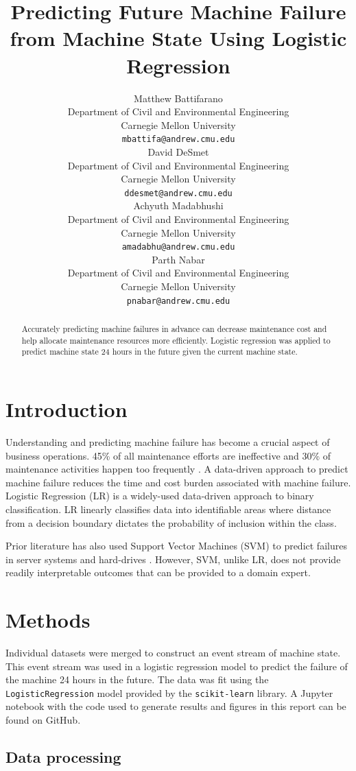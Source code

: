 \documentclass{article}
\title{Predicting Future Machine Failure from Machine State Using Logistic Regression}
\author{
  Matthew Battifarano\\
  Department of Civil and Environmental Engineering\\
  Carnegie Mellon University\\
  \texttt{mbattifa@andrew.cmu.edu} \\
   \And
  David DeSmet \\
  Department of Civil and Environmental Engineering \\
  Carnegie Mellon University \\
  \texttt{ddesmet@andrew.cmu.edu} \\
  \And
  Achyuth Madabhushi\\
  Department of Civil and Environmental Engineering\\
  Carnegie Mellon University  \\
  \texttt{amadabhu@andrew.cmu.edu} \\
  \AND
  Parth Nabar \\
  Department of Civil and Environmental Engineering\\
  Carnegie Mellon University\\
  \texttt{pnabar@andrew.cmu.edu} \\
}
\begin{document}

\maketitle

\begin{abstract}
  Accurately predicting machine failures in advance can decrease maintenance cost and help allocate maintenance resources more efficiently. Logistic regression was applied to predict machine state 24 hours in the future given the current machine state.
\end{abstract}


\section{Introduction}
Understanding and predicting machine failure has become a crucial aspect of business operations. 45\% of all maintenance efforts are ineffective and 30\% of maintenance activities happen too frequently \cite{IBM-machinefailure}. A data-driven approach to predict machine failure reduces the time and cost burden associated with machine failure. Logistic Regression (LR) is a widely-used data-driven approach to binary classification. LR linearly classifies data into identifiable areas where distance from a decision boundary dictates the probability of inclusion within the class. \cite{Shalizi2012}

Prior literature has also used Support Vector Machines (SVM) to predict failures in server systems \cite{Murray2005} and hard-drives \cite{Turnbull2003}. However, SVM, unlike LR, does not provide readily interpretable outcomes that can be provided to a domain expert. 

\section{Methods}

Individual datasets were merged to construct an event stream of machine state. This event stream was used in a logistic regression model to predict the failure of the machine 24 hours in the future. The data was fit using the \texttt{LogisticRegression} model provided by the \texttt{scikit-learn} library. \cite{scikit-learn} A Jupyter notebook\cite{Kluyver2016} with the code used to generate results and figures in this report can be found on GitHub. \cite{2018HackAuton} 

\subsection{Data processing}
\end{document}
